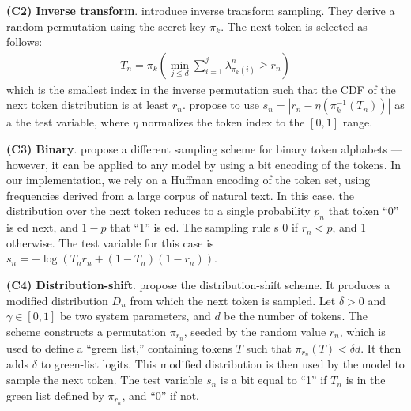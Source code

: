 \smallskip\noindent\textbf{(C2) Inverse transform}.
%
\citet{kuditipudi_robust_2023} introduce inverse transform sampling.
%
They derive a random permutation using the secret key $\pi_k$. The next token is selected as follows:
\begin{align}
    T_{n} = \pi_k \left( \min\limits_{ j \leq d } \sum\limits_{i=1}^j \lambda^n_{\pi_k (i)} \geq r_n \right)
\end{align}
which is the smallest index in the inverse permutation such that the CDF of the next token distribution is at least $r_n$.
%
\citet{kuditipudi_robust_2023} propose to use $s_n = | r_n - \eta \left( \pi^{-1}_k(T_n) \right) |$ as a the test variable, where $\eta$ normalizes the token index to the $[0,1]$ range.
%

\smallskip\noindent\textbf{(C3) Binary}.
%
\citet{christ_undetectable_2023} propose a different sampling scheme for binary token alphabets --- however, it can be applied to any model by using a bit encoding of the tokens.
%
In our implementation, we rely on a Huffman encoding of the token set, using frequencies derived from a large corpus of natural text.
%
In this case, the distribution over the next token reduces to a single probability $p_n$ that token ``0'' is ed next, and $1-p$ that ``1'' is ed.
%
The sampling rule s 0 if $r_n < p$, and 1 otherwise. The test variable for this case is $s_n = -\log \left( T_n r_n + (1-T_n) (1-r_n) \right)$.
%
%
%

\smallskip\noindent\textbf{(C4) Distribution-shift}.
%
\citet{kirchenbauer_watermark_2023} propose the distribution-shift scheme. 
%
It produces a modified distribution $D_n$ from which the next token is sampled.
%
Let $\delta > 0$ and $\gamma \in [0,1]$ be two system parameters, and $d$ be the number of tokens.
%
The scheme constructs a permutation $\pi_{r_n}$, seeded by the random value $r_n$, which is used to define a ``green list,'' containing tokens $T$ such that $\pi_{r_n} (T) < \delta d$. It then adds $\delta$ to green-list logits.
%
This modified distribution is then used by the model to sample the next token. The test variable $s_n$ is a bit equal to ``1'' if $T_n$ is in the green list defined by $\pi_{r_n}$, and ``0'' if not.
%

